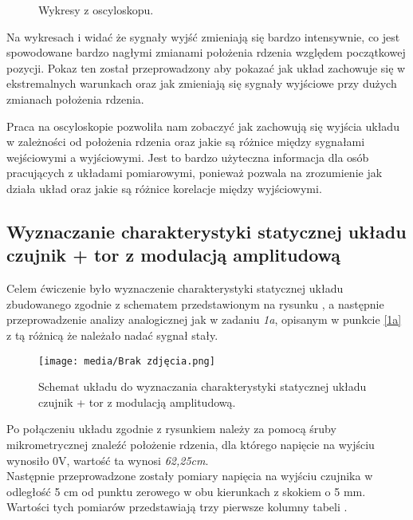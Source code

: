 \documentclass{article}
\begin{document}
\begin{figure}[!ht]
    \centering

    \caption{Wykresy z oscyloskopu.}
    \label{fig:main1}
\end{figure}


\vspace{1em}
Na wykresach  i  widać że sygnały wyjść zmieniają się bardzo intensywnie, co jest spowodowane bardzo nagłymi zmianami położenia rdzenia względem początkowej pozycji. Pokaz ten został przeprowadzony aby pokazać jak układ zachowuje się w ekstremalnych warunkach oraz jak zmieniają się sygnały wyjściowe przy dużych zmianach położenia rdzenia.

\vspace{1em}
Praca na oscyloskopie pozwoliła nam zobaczyć jak zachowują się wyjścia układu w zależności od położenia rdzenia oraz jakie są różnice między sygnałami wejściowymi a wyjściowymi. Jest to bardzo użyteczna informacja dla osób pracujących z układami pomiarowymi, ponieważ pozwala na zrozumienie jak działa układ oraz jakie są różnice korelacje między wyjściowymi.
\newpage
\subsection{Wyznaczanie charakterystyki statycznej układu czujnik + tor z modulacją amplitudową}

Celem ćwiczenie było wyznaczenie charakterystyki statycznej układu zbudowanego zgodnie z schematem przedstawionym na rysunku , a następnie przeprowadzenie analizy analogicznej jak w zadaniu \textit{1a}, opisanym w punkcie \ref{1a} z tą różnicą że należało nadać sygnał stały.

\begin{figure}[ht]
    \centering
    \texttt{[image: media/Brak zdjęcia.png]}
    \caption{Schemat układu do wyznaczania charakterystyki statycznej układu czujnik + tor z modulacją amplitudową.}
    \label{fig6}
\end{figure}
\newpage
Po połączeniu układu zgodnie z rysunkiem  należy za pomocą śruby mikrometrycznej znaleźć położenie rdzenia, dla którego napięcie na wyjściu wynosiło 0V, wartość ta wynosi \textit{62,25cm}.\\Następnie przeprowadzone zostały pomiary napięcia na wyjściu czujnika w odległość 5 cm od punktu zerowego w obu kierunkach z skokiem o 5 mm. Wartości tych pomiarów przedstawiają trzy pierwsze kolumny tabeli .
\end{document}
